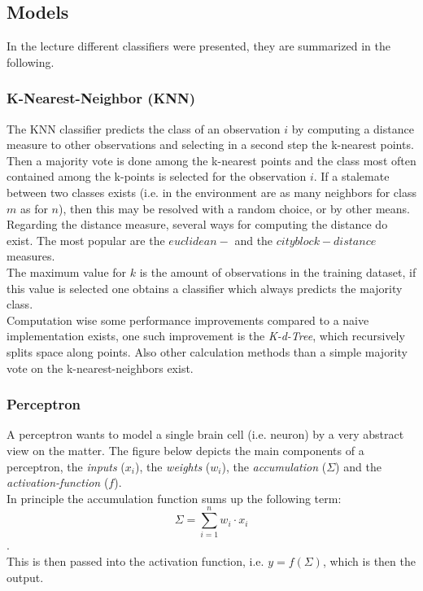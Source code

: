 \documentclass[12pt,a4paper]{article}
\begin{document}
\subsection{Models}
\label{subsec:class-models}

\noindent In the lecture different classifiers were presented, they are summarized in the following.

\subsubsection{K-Nearest-Neighbor (KNN)}

\noindent The KNN classifier predicts the class of an observation \(i\) by computing a distance measure to other observations and selecting in a second step the k-nearest points. Then a majority vote is done among the k-nearest points and the class most often contained among the k-points is selected for the observation \(i\). If a stalemate between two classes exists (i.e. in the environment are as many neighbors for class \(m\) as for \(n\)), then this may be resolved with a random choice, or by other means.\\[1em]
Regarding the distance measure, several ways for computing the distance do exist. The most popular are the \(euclidean-\) and the \(cityblock-distance\) measures.\\[1em]
The maximum value for \(k\) is the amount of observations in the training dataset, if this value is selected one obtains a classifier which always predicts the majority class.\\
Computation wise some performance improvements compared to a naive implementation exists, one such improvement is the \textit{K-d-Tree}, which recursively splits space along points. Also other calculation methods than a simple majority vote on the k-nearest-neighbors exist.

\subsubsection{Perceptron}
\label{subsubsec:perceptron}

\noindent A perceptron wants to model a single brain cell (i.e. neuron) by a very abstract view on the matter. The figure below depicts the main components of a perceptron, the \textit{inputs} (\(x_i\)), the \textit{weights} (\(w_i\)), the \textit{accumulation} (\(\Sigma\)) and the \textit{activation-function} (\(f\)).\\
In principle the accumulation function sums up the following term: \[\Sigma = \sum_{i = 1}^n w_i \cdot x_i\].\\
This is then passed into the activation function, i.e. \(y = f(\Sigma)\), which is then the output.
\end{document}
